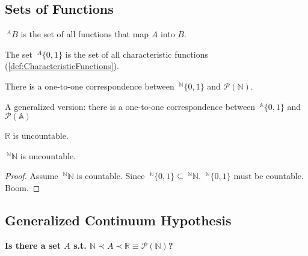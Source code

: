 \subsection{Sets of Functions}

\begin{definition}
    \label{def:SetOfFunction}
    $~^{A} B$ is the set of all functions that map $A$ into $B$.
\end{definition}
\begin{remark}
    The set $~^A\{0,1\}$ is the set of all characteristic functions (\ref{def:CharacteristicFunctions}).
\end{remark}

\begin{theorem}
    There is a one-to-one correspondence between $~^{\mathbb{N}}\{0,1\}$ and $\mathcal{P}(\mathbb{N})$.
\end{theorem}
\begin{remark}
    A generalized version: there is a one-to-one correspondence between $~^{\mathbb{A}}\{0,1\}$ and $\mathcal{P}(\mathbb{A})$
\end{remark}
\begin{corollary}
    \label{cor:RealIsUncountable}
    $\mathbb{R}$ is uncountable.
\end{corollary}
\begin{theorem}
    \label{thm:NNisUncountable}
    $~^\mathbb{N}\mathbb{N}$ is uncountable.
\end{theorem}
\begin{proof}
    Assume $~^\mathbb{N}\mathbb{N}$ is countable. Since $~^\mathbb{N}\{0,1\} \subseteq ~^\mathbb{N}\mathbb{N}$. $~^\mathbb{N}\{0,1\}$ must be countable. Boom.
\end{proof}

\subsection{Generalized Continuum Hypothesis}

\begin{center}
    \textbf{Is there a set $A$ s.t. $\mathbb{N} \prec A \prec \mathbb{R} \equiv \mathcal{P}(\mathbb{N})$?}
\end{center}
